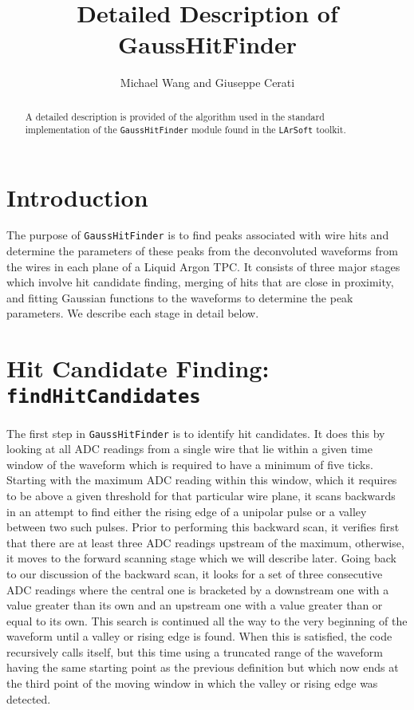 \documentclass[a4paper]{article}
\title{Detailed Description of GaussHitFinder}
\author{Michael Wang and Giuseppe Cerati}
\begin{document}
\maketitle

\begin{abstract}
A detailed description is provided of the algorithm used in the standard implementation of the \texttt{GaussHitFinder} module found in the \texttt{LArSoft} toolkit.
\end{abstract}

\section{Introduction}

The purpose of \texttt{GaussHitFinder} is to find peaks associated with wire hits and determine the parameters of these peaks from the deconvoluted  waveforms from the wires in each plane of a Liquid Argon TPC.  It consists of three major stages which involve hit candidate finding, merging of hits that are close in proximity, and fitting Gaussian functions to the waveforms to determine the peak parameters.  We describe each stage in detail below.

\section{Hit Candidate Finding: \texttt{findHitCandidates}}
The first step in \texttt{GaussHitFinder} is to identify hit candidates.  It does this by looking at all ADC readings from a single wire that lie within a given time window of the waveform which is required to have a minimum of five ticks. Starting with the maximum ADC reading within this window, which it requires to be above a given threshold for that particular wire plane, it scans backwards in an attempt to find either the rising edge of a unipolar pulse or a valley between two such pulses. Prior to performing this backward scan, it verifies first that there are at least three ADC readings upstream of the maximum, otherwise, it moves to the forward scanning stage which we will describe later. Going back to our discussion of the backward scan, it looks for a set of three consecutive ADC readings where the central one is bracketed by a downstream one with a value greater than its own and an upstream one with a value greater than or equal to its own.  This search is continued all the way to the very beginning of the waveform until a valley or rising edge is found. When this is satisfied, the code recursively calls itself, but this time using a truncated range of the waveform having the same starting point as the previous definition but which now ends at the third point of the moving window in which the valley or rising edge was detected.
\end{document}
